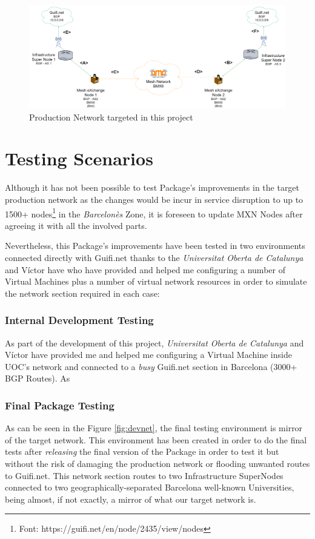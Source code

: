 \begin{landscape}

\begin{figure}[ht!]
    \centering
    \includegraphics[width=\hsize]{images/targetnet}
    \caption{Production Network targeted in this project}
    \label{fig:tarnet}
\end{figure}
\end{landscape}
\newpage

\section{Testing Scenarios}
Although it has not been possible to test Package's improvements in the target production network as the changes would be incur in service disruption to up to 1500+ nodes\footnote{Font: https://guifi.net/en/node/2435/view/nodes} in the \textit{Barcelon\`{e}s}  Zone, it is foreseen to update MXN Nodes after agreeing it with all the involved parts.

Nevertheless, this Package's improvements have been tested in two environments connected directly with Guifi.net thanks to the \textit{Universitat Oberta de Catalunya} and V\'{i}ctor have who have provided and helped me configuring a number of Virtual Machines plus a number of virtual network resources in order to simulate the network section required in each case: 

\subsubsection{Internal Development Testing}
As part of the development of this project, \textit{Universitat Oberta de Catalunya} and V\'{i}ctor have provided me and helped me configuring a Virtual Machine inside UOC's network and connected to a \textit{busy} Guifi.net section in Barcelona (3000+ BGP Routes). As 

\subsubsection{Final Package Testing}
As can be seen in the Figure \ref{fig:devnet}, the final testing environment is mirror of the target network. This environment has been created in order to do the final tests after \textit{releasing} the final version of the Package in order to test it but without the risk of damaging the production network or flooding unwanted routes to Guifi.net. This network section routes to two Infrastructure SuperNodes connected to two geographically-separated Barcelona well-known Universities, being almost, if not exactly, a mirror of what our target network is. 

